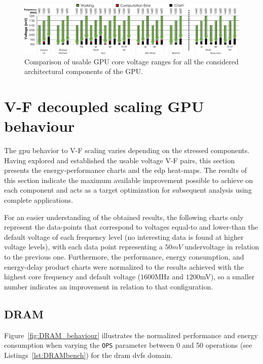 \begin{figure}[h]
    \centering
        \includegraphics[width=1\textwidth]{Figures/GPU_characterization/Comparison_Guardband.pdf}
        \caption{Comparison of usable GPU core voltage ranges for all the considered architectural components of the GPU.}
    \label{fig:Guardband_comparison}
\end{figure}

\section{V-F decoupled scaling GPU behaviour}
\label{sec:gpu_behaviour}

The \acrshort{gpu} behavior to V-F scaling varies depending on the stressed components. Having explored and established the usable voltage V-F  pairs, this section presents the energy-performance charts and the \acrshort{edp} heat-maps. The results of this section indicate the maximum available improvement possible to achieve on each component and acts as a target optimization for subsequent analysis using complete applications.

For an easier understanding of the obtained results, the following charts only represent the data-points that correspond to voltages equal-to and lower-than the default voltage of each frequency level (no interesting data is found at higher voltage levels), with each data point representing a $50mV$ undervoltage in relation to the previous one.
Furthermore, the performance, energy consumption, and energy-delay product charts were normalized to the results achieved with the highest core frequency and default voltage ($1600$MHz and $1200$mV), so a smaller number indicates an improvement in relation to that configuration. 

\subsection{DRAM}

Figure~\ref{fig:DRAM_behaviour} illustrates the normalized performance and energy consumption when varying the \texttt{OPS} parameter between 0 and 50 operations (see Listings~\ref{lst:DRAMbench}) for the \acrshort{dram} \acrshort{dvfs} domain.

